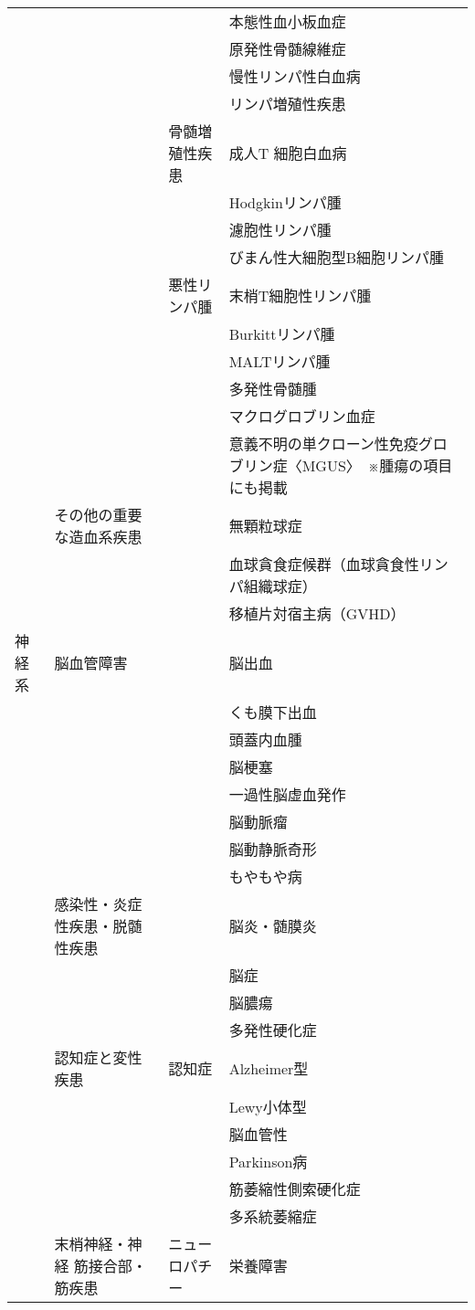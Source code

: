 \begin{xltabular}{\linewidth}{XXXX}
 &  &  & 本態性血小板血症 \\
 &  &  & 原発性骨髄線維症 \\
 &  &  & 慢性リンパ性白血病 \\
 &  &  & リンパ増殖性疾患 \\
 &  & 骨髄増殖性疾患 & 成人T 細胞白血病 \\
 &  &  & Hodgkinリンパ腫 \\
 &  &  & 濾胞性リンパ腫 \\
 &  &  & びまん性大細胞型B細胞リンパ腫 \\
 &  & 悪性リンパ腫 & 末梢T細胞性リンパ腫 \\
 &  &  & Burkittリンパ腫 \\
 &  &  & MALTリンパ腫 \\
 &  &  & 多発性骨髄腫 \\
 &  &  & マクログロブリン血症 \\
 &  &  & 意義不明の単クローン性免疫グロブリン症〈MGUS〉　※腫瘍の項目にも掲載 \\
 & その他の重要な造血系疾患 &  & 無顆粒球症 \\
 &  &  & 血球貪食症候群（血球貪食性リンパ組織球症） \\
 &  &  & 移植片対宿主病（GVHD） \\
神経系 & 脳血管障害 &  & 脳出血 \\
 &  &  & くも膜下出血 \\
 &  &  & 頭蓋内血腫 \\
 &  &  & 脳梗塞 \\
 &  &  & 一過性脳虚血発作 \\
 &  &  & 脳動脈瘤 \\
 &  &  & 脳動静脈奇形 \\
 &  &  & もやもや病 \\
 & 感染性・炎症性疾患・脱髄性疾患 &  & 脳炎・髄膜炎 \\
 &  &  & 脳症 \\
 &  &  & 脳膿瘍 \\
 &  &  & 多発性硬化症 \\
 & 認知症と変性疾患 & 認知症 & Alzheimer型 \\
 &  &  & Lewy小体型 \\
 &  &  & 脳血管性 \\
 &  &  & Parkinson病 \\
 &  &  & 筋萎縮性側索硬化症 \\
 &  &  & 多系統萎縮症 \\
 & 末梢神経・神経 筋接合部・筋疾患 & ニューロパチー & 栄養障害 \\

\end{xltabular}
